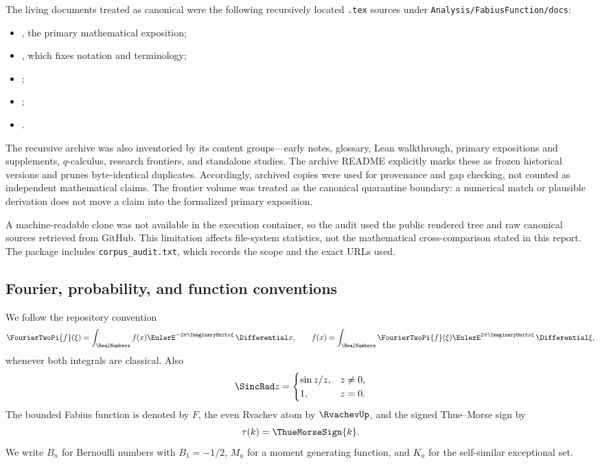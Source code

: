\documentclass[11pt,oneside]{article}
\numberwithin{equation}{section}
\theoremstyle{definition}
\theoremstyle{remark}
\begin{document}
The living documents treated as canonical were the following recursively
located \texttt{.tex} sources under \texttt{Analysis/FabiusFunction/docs}:
\begin{itemize}
\item {},
  the primary mathematical exposition;
\item {},
  which fixes notation and terminology;
\item {};
\item {};
\item {}.
\end{itemize}
The recursive archive was also inventoried by its content groups---early notes,
glossary, Lean walkthrough, primary expositions and supplements, $q$-calculus,
research frontiers, and standalone studies.  The archive README explicitly
marks these as frozen historical versions and prunes byte-identical duplicates.
Accordingly, archived copies were used for provenance and gap checking, not
counted as independent mathematical claims.  The frontier volume was treated
as the canonical quarantine boundary: a numerical match or plausible
derivation does not move a claim into the formalized primary exposition.

A machine-readable clone was not available in the execution container, so the
audit used the public rendered tree and raw canonical sources retrieved from
GitHub.  This limitation affects file-system statistics, not the mathematical
cross-comparison stated in this report.  The package includes
\texttt{corpus\_audit.txt}, which records the scope and the exact URLs used.

\subsection{Fourier, probability, and function conventions}

We follow the repository convention
\begin{equation}\label{p6:eq:fourier-convention}
 \FourierTwoPi{f}(\xi)=\int_{\RealNumbers}f(x)\EulerE^{-2\pi\ImaginaryUnit x\xi}\,\Differential x,
 \qquad
 f(x)=\int_{\RealNumbers}\FourierTwoPi{f}(\xi)\EulerE^{2\pi\ImaginaryUnit x\xi}\,\Differential\xi,
\end{equation}
whenever both integrals are classical.  Also
\[
 \SincRad z=\begin{cases}\sin z/z,&z\ne0,\\1,&z=0.\end{cases}
\]
The bounded Fabius function is denoted by $F$, the even Rvachev atom by $\RvachevUp$,
and the signed Thue--Morse sign by
\[
 \tau(k)=\ThueMorseSign{k}.
\]
We write $B_n$ for Bernoulli numbers with $B_1=-1/2$, $M_a$ for a moment
generating function, and $K_a$ for the self-similar exceptional set.
\end{document}
